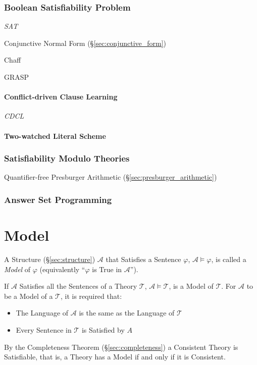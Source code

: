 \subsubsection{Boolean Satisfiability Problem}\label{sec:sat}

\emph{SAT}

Conjunctive Normal Form (\S\ref{sec:conjunctive_form})

Chaff

GRASP



\paragraph{Conflict-driven Clause Learning}\label{sec:cdcl}\hfill

\emph{CDCL}



\paragraph{Two-watched Literal Scheme}\label{sec:twowatched_literal}\hfill



\subsubsection{Satisfiability Modulo Theories}\label{sec:smt}

Quantifier-free Presburger Arithmetic
(\S\ref{sec:presburger_arithmetic})



\subsubsection{Answer Set Programming}\label{sec:asp}



\section{Model}\label{sec:model}

A Structure (\S\ref{sec:structure}) $\mathcal{A}$ that Satisfies a
Sentence $\varphi$, $\mathcal{A} \models \varphi$, is called a
\emph{Model} of $\varphi$ (equivalently ``$\varphi$ is True in
$\mathcal{A}$'').

If $\mathcal{A}$ Satisfies all the Sentences of a Theory
$\mathcal{T}$, $\mathcal{A} \models \mathcal{T}$, is a Model of
$\mathcal{T}$. For $\mathcal{A}$ to be a Model of a $\mathcal{T}$, it
is required that:
\begin{itemize}
  \item The Language of $\mathcal{A}$ is the same as the Language of
    $\mathcal{T}$
  \item Every Sentence in $\mathcal{T}$ is Satisfied by $A$
\end{itemize}
By the Completeness Theorem (\S\ref{sec:completeness}) a Consistent
Theory is Satisfiable, that is, a Theory has a Model if and only if it
is Consistent.

